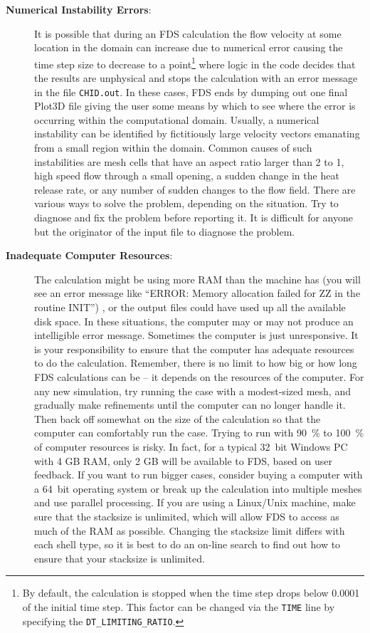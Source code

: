 \documentclass[11pt]{book}
\newcommand{\ct}{\tt\small}
\begin{document}
\begin{description}
\item [{\bf Numerical Instability Errors}:]
It is possible that during an FDS calculation the flow
velocity at some location in the domain can increase due to numerical error causing the time step
size to decrease to a point\footnote{By default, the calculation is stopped when the time step drops below 0.0001 of the initial time step. This
factor can be changed via the {\ct TIME} line by specifying the {\ct DT\_LIMITING\_RATIO}.} where logic in the code decides that the results are unphysical
and stops the calculation with an error message in the file {\ct CHID.out}.
In these cases, FDS ends by dumping out one final
Plot3D file giving the user some means by which to see where the
error is occurring within the computational domain. Usually, a numerical
instability can be identified by fictitiously large velocity vectors emanating from
a small region within the domain. Common causes of such instabilities are
mesh cells that have an aspect ratio larger than 2 to 1, high speed flow through a small
opening, a sudden change in the heat release rate, or any number of sudden changes to the
flow field. There are various ways to solve the problem, depending on the situation.
Try to diagnose and fix the problem before reporting it. It is difficult
for anyone but the originator of the input file to diagnose the problem.

\item[{\bf Inadequate Computer Resources}:]
The calculation might be using more RAM than the machine
has (you will see an error message like ``ERROR: Memory allocation failed for ZZ in the routine INIT'') , or the output files could have used up all the available disk space. In these situations, the
computer may or may not produce an intelligible error message. Sometimes the computer is just
unresponsive. It is your responsibility to ensure that the computer has adequate resources to
do the calculation. Remember, there is no limit to how big or how long FDS calculations can be -- it
depends on the resources of the computer. For any new simulation, try running the case with a modest-sized mesh,
and gradually make refinements until the computer can no longer handle it. Then back off
somewhat on the size of the calculation so that the computer can comfortably run the
case. Trying to run with 90~\% to 100~\% of computer resources is risky.
In fact, for a typical 32~bit Windows PC with 4 GB RAM, only 2 GB will be available to FDS, based on user feedback.
If you want to run bigger cases, consider buying a computer with a 64~bit operating system or break up the
calculation into multiple meshes and use parallel processing. If you are using a Linux/Unix machine, make sure that
the stacksize is unlimited, which will allow FDS to access as much of the RAM as possible. Changing the stacksize
limit differs with each shell type, so it is best to do an on-line search to find out how to ensure that your
stacksize is unlimited.


\end{description}
\end{document}
